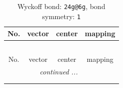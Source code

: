 \documentclass[fleqn,8pt]{jsarticle}
\begin{document}
\renewcommand{\arraystretch}{1.2}
\begin{longtable}{cccc}
\caption{Wyckoff bond: {\tt 24g@6g}, bond symmetry: {\tt 1}}
 \\
 \hline \hline
No. & vector & center & mapping \\ \hline \endfirsthead

\multicolumn{3}{l}{\tablename\ \thetable{}} \\
 \hline \hline
No. & vector & center & mapping \\ \hline \endhead

 \hline \hline
\multicolumn{3}{r}{\footnotesize\it continued ...} \\ \endfoot

 \hline \hline
\multicolumn{3}{r}{} \\ \endlastfoot


\end{longtable}
\end{document}
